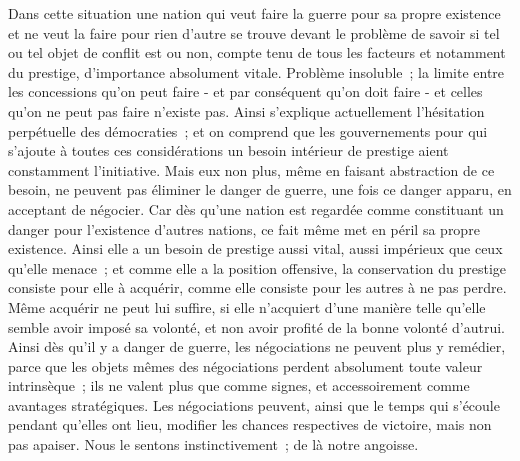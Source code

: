 \documentclass[french,twoside]{book} %
\begin{document}
Dans cette situation une nation qui veut faire la guerre pour sa propre existence et ne veut la faire pour rien d'autre se trouve devant le problème de savoir si tel ou tel objet de conflit est ou non, compte tenu de tous les facteurs et notamment du prestige, d'importance absolument vitale. Problème inso­luble ; la limite entre les concessions qu'on peut faire - et par conséquent qu'on doit faire - et celles qu'on ne peut pas faire n'existe pas. Ainsi s'explique actuellement l'hésitation perpétuelle des démocraties ; et on comprend que les gouvernements pour qui s'ajoute à toutes ces considérations un besoin intérieur de prestige aient constamment l'initiative. Mais eux non plus, même en faisant abstraction de ce besoin, ne peuvent pas éliminer le danger de guerre, une fois ce danger apparu, en acceptant de négocier. Car dès qu'une nation est regardée comme constituant un danger pour l'existence d'autres nations, ce fait même met en péril sa propre existence. Ainsi elle a un besoin de prestige aussi vital, aussi impérieux que ceux qu'elle menace ; et comme elle a la position offensive, la conservation du prestige consiste pour elle à acquérir, comme elle consiste pour les autres à ne pas perdre. Même acquérir ne peut lui suffire, si elle n'acquiert d'une manière telle qu'elle semble avoir imposé sa volonté, et non avoir profité de la bonne volonté d'autrui. Ainsi dès qu'il y a danger de guerre, les négociations ne peuvent plus y remédier, parce que les objets mêmes des négociations perdent absolument toute valeur intrinsèque ; ils ne valent plus que comme signes, et accessoirement comme avantages stratégiques. Les négociations peuvent, ainsi que le temps qui s'écoule pendant qu'elles ont lieu, modifier les chances respectives de victoire, mais non pas apaiser. Nous le sentons instinctivement ; de là notre angoisse.\par
\end{document}

